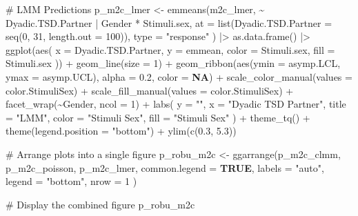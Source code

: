 \documentclass[
  bookmarksnumbered]{article}
\newenvironment{Shaded}{\begin{snugshade}}{\end{snugshade}}
\newcommand{\AttributeTok}[1]{\textcolor[rgb]{0.80,0.80,0.80}{#1}}
\newcommand{\CommentTok}[1]{\textcolor[rgb]{0.50,0.62,0.50}{#1}}
\newcommand{\ConstantTok}[1]{\textcolor[rgb]{0.86,0.64,0.64}{\textbf{#1}}}
\newcommand{\DecValTok}[1]{\textcolor[rgb]{0.86,0.86,0.80}{#1}}
\newcommand{\FloatTok}[1]{\textcolor[rgb]{0.75,0.75,0.82}{#1}}
\newcommand{\FunctionTok}[1]{\textcolor[rgb]{0.94,0.94,0.56}{#1}}
\newcommand{\NormalTok}[1]{\textcolor[rgb]{0.80,0.80,0.80}{#1}}
\newcommand{\OtherTok}[1]{\textcolor[rgb]{0.94,0.94,0.56}{#1}}
\newcommand{\SpecialCharTok}[1]{\textcolor[rgb]{0.86,0.64,0.64}{#1}}
\newcommand{\StringTok}[1]{\textcolor[rgb]{0.80,0.58,0.58}{#1}}
\begin{document}
\begin{Shaded}
\begin{Highlighting}[]
\CommentTok{\# LMM Predictions}
\NormalTok{p\_m2c\_lmer }\OtherTok{\textless{}{-}} \FunctionTok{emmeans}\NormalTok{(m2c\_lmer, }\SpecialCharTok{\textasciitilde{}}\NormalTok{ Dyadic.TSD.Partner }\SpecialCharTok{|}\NormalTok{ Gender }\SpecialCharTok{*}\NormalTok{ Stimuli.sex,}
  \AttributeTok{at =} \FunctionTok{list}\NormalTok{(}\AttributeTok{Dyadic.TSD.Partner =} \FunctionTok{seq}\NormalTok{(}\DecValTok{0}\NormalTok{, }\DecValTok{31}\NormalTok{, }\AttributeTok{length.out =} \DecValTok{100}\NormalTok{)),}
  \AttributeTok{type =} \StringTok{"response"}
\NormalTok{) }\SpecialCharTok{|\textgreater{}}
  \FunctionTok{as.data.frame}\NormalTok{() }\SpecialCharTok{|\textgreater{}}
  \FunctionTok{ggplot}\NormalTok{(}\FunctionTok{aes}\NormalTok{(}
    \AttributeTok{x =}\NormalTok{ Dyadic.TSD.Partner, }\AttributeTok{y =}\NormalTok{ emmean,}
    \AttributeTok{color =}\NormalTok{ Stimuli.sex, }\AttributeTok{fill =}\NormalTok{ Stimuli.sex}
\NormalTok{  )) }\SpecialCharTok{+}
  \FunctionTok{geom\_line}\NormalTok{(}\AttributeTok{size =} \DecValTok{1}\NormalTok{) }\SpecialCharTok{+}
  \FunctionTok{geom\_ribbon}\NormalTok{(}\FunctionTok{aes}\NormalTok{(}\AttributeTok{ymin =}\NormalTok{ asymp.LCL, }\AttributeTok{ymax =}\NormalTok{ asymp.UCL), }\AttributeTok{alpha =} \FloatTok{0.2}\NormalTok{, }\AttributeTok{color =} \ConstantTok{NA}\NormalTok{) }\SpecialCharTok{+}
  \FunctionTok{scale\_color\_manual}\NormalTok{(}\AttributeTok{values =}\NormalTok{ color.StimuliSex) }\SpecialCharTok{+}
  \FunctionTok{scale\_fill\_manual}\NormalTok{(}\AttributeTok{values =}\NormalTok{ color.StimuliSex) }\SpecialCharTok{+}
  \FunctionTok{facet\_wrap}\NormalTok{(}\SpecialCharTok{\textasciitilde{}}\NormalTok{Gender, }\AttributeTok{ncol =} \DecValTok{1}\NormalTok{) }\SpecialCharTok{+}
  \FunctionTok{labs}\NormalTok{(}
    \AttributeTok{y =} \StringTok{""}\NormalTok{, }\AttributeTok{x =} \StringTok{"Dyadic TSD Partner"}\NormalTok{,}
    \AttributeTok{title =} \StringTok{"LMM"}\NormalTok{,}
    \AttributeTok{color =} \StringTok{"Stimuli Sex"}\NormalTok{, }\AttributeTok{fill =} \StringTok{"Stimuli Sex"}
\NormalTok{  ) }\SpecialCharTok{+}
  \FunctionTok{theme\_tq}\NormalTok{() }\SpecialCharTok{+}
  \FunctionTok{theme}\NormalTok{(}\AttributeTok{legend.position =} \StringTok{"bottom"}\NormalTok{) }\SpecialCharTok{+}
  \FunctionTok{ylim}\NormalTok{(}\FunctionTok{c}\NormalTok{(}\FloatTok{0.3}\NormalTok{, }\FloatTok{5.3}\NormalTok{))}

\CommentTok{\# Arrange plots into a single figure}
\NormalTok{p\_robu\_m2c }\OtherTok{\textless{}{-}} \FunctionTok{ggarrange}\NormalTok{(p\_m2c\_clmm, p\_m2c\_poisson, p\_m2c\_lmer,}
  \AttributeTok{common.legend =} \ConstantTok{TRUE}\NormalTok{, }\AttributeTok{labels =} \StringTok{"auto"}\NormalTok{, }\AttributeTok{legend =} \StringTok{"bottom"}\NormalTok{, }\AttributeTok{nrow =} \DecValTok{1}
\NormalTok{)}

\CommentTok{\# Display the combined figure}
\NormalTok{p\_robu\_m2c}
\end{Highlighting}
\end{Shaded}
\end{document}
